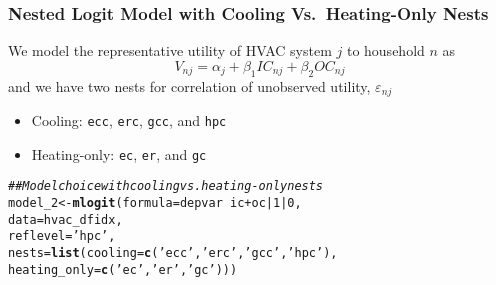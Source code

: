 \documentclass{beamer}\usepackage[]{graphicx}\usepackage[]{color}
\makeatletter
\newcommand{\hlnum}[1]{\textcolor[rgb]{0.686,0.059,0.569}{#1}}%
\newcommand{\hlstr}[1]{\textcolor[rgb]{0.192,0.494,0.8}{#1}}%
\newcommand{\hlcom}[1]{\textcolor[rgb]{0.678,0.584,0.686}{\textit{#1}}}%
\newcommand{\hlopt}[1]{\textcolor[rgb]{0,0,0}{#1}}%
\newcommand{\hlstd}[1]{\textcolor[rgb]{0.345,0.345,0.345}{#1}}%
\newcommand{\hlkwb}[1]{\textcolor[rgb]{0.69,0.353,0.396}{#1}}%
\newcommand{\hlkwc}[1]{\textcolor[rgb]{0.333,0.667,0.333}{#1}}%
\newcommand{\hlkwd}[1]{\textcolor[rgb]{0.737,0.353,0.396}{\textbf{#1}}}%
\newenvironment{kframe}{%
 \def\at@end@of@kframe{}%
 \ifinner\ifhmode%
  \def\at@end@of@kframe{\end{minipage}}%
  \begin{minipage}{\columnwidth}%
 \fi\fi%
 \def\FrameCommand##1{\hskip\@totalleftmargin \hskip-\fboxsep
 \colorbox{shadecolor}{##1}\hskip-\fboxsep
     \hskip-\linewidth \hskip-\@totalleftmargin \hskip\columnwidth}%
 \MakeFramed {\advance\hsize-\width
   \@totalleftmargin\z@ \linewidth\hsize
   \@setminipage}}%
 {\par\unskip\endMakeFramed%
 \at@end@of@kframe}
\newenvironment{knitrout}{}{} %
\makeatother
\begin{document}
\begin{frame}[fragile]\frametitle{Nested Logit Model with Cooling Vs.\ Heating-Only Nests}
    We model the representative utility of HVAC system $j$ to household $n$ as
    $$V_{nj} = \alpha_j + \beta_1 IC_{nj} + \beta_2 OC_{nj}$$
    and we have two nests for correlation of unobserved utility, $\varepsilon_{nj}$
    \begin{itemize}
    	\item Cooling: \texttt{ecc}, \texttt{erc}, \texttt{gcc}, and \texttt{hpc}
    	\item Heating-only: \texttt{ec}, \texttt{er}, and \texttt{gc}
    \end{itemize}
\begin{knitrout}\footnotesize
{}\color{fgcolor}\begin{kframe}
\begin{alltt}
\hlcom{## Model choice with cooling vs. heating-only nests}
\hlstd{model_2} \hlkwb{<-} \hlkwd{mlogit}\hlstd{(}\hlkwc{formula} \hlstd{= depvar} \hlopt{~} \hlstd{ic} \hlopt{+} \hlstd{oc} \hlopt{|} \hlnum{1} \hlopt{|} \hlnum{0}\hlstd{,}
                  \hlkwc{data} \hlstd{= hvac_dfidx,}
                  \hlkwc{reflevel} \hlstd{=} \hlstr{'hpc'}\hlstd{,}
                  \hlkwc{nests} \hlstd{=} \hlkwd{list}\hlstd{(}\hlkwc{cooling} \hlstd{=} \hlkwd{c}\hlstd{(}\hlstr{'ecc'}\hlstd{,} \hlstr{'erc'}\hlstd{,} \hlstr{'gcc'}\hlstd{,} \hlstr{'hpc'}\hlstd{),}
                               \hlkwc{heating_only} \hlstd{=} \hlkwd{c}\hlstd{(}\hlstr{'ec'}\hlstd{,} \hlstr{'er'}\hlstd{,} \hlstr{'gc'}\hlstd{)))}
\end{alltt}
\end{kframe}
\end{knitrout}
\end{frame}
\end{document}
